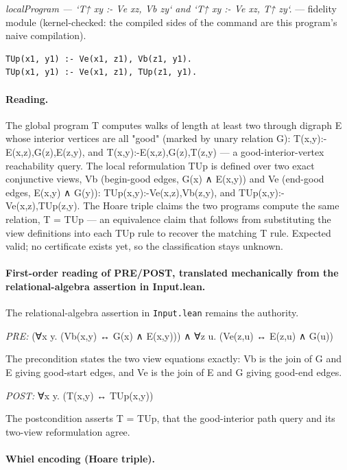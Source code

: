 \documentclass[10pt]{article}
\begin{document}
{\raggedright\textit{localProgram --- `T↑ xy :- Ve xz, Vb zy` and `T↑ xy :- Ve xz, T↑ zy`.} --- fidelity module (kernel-checked: the compiled sides of the command are this program's naive compilation).\par}

\begin{Verbatim}[fontsize=\scriptsize,breaklines=true,breakanywhere=true,frame=single,framesep=1.5mm]
TUp(x1, y1) :- Ve(x1, z1), Vb(z1, y1).
TUp(x1, y1) :- Ve(x1, z1), TUp(z1, y1).
\end{Verbatim}

\paragraph{Reading.} The global program T computes walks of length at least two through digraph E whose interior vertices are all "good" (marked by unary relation G): T(x,y):-E(x,z),G(z),E(z,y), and T(x,y):-E(x,z),G(z),T(z,y) --- a good-interior-vertex reachability query. The local reformulation TUp is defined over two exact conjunctive views, Vb (begin-good edges, G(x) ∧ E(x,y)) and Ve (end-good edges, E(x,y) ∧ G(y)): TUp(x,y):-Ve(x,z),Vb(z,y), and TUp(x,y):-Ve(x,z),TUp(z,y). The Hoare triple claims the two programs compute the same relation, T = TUp --- an equivalence claim that follows from substituting the view definitions into each TUp rule to recover the matching T rule. Expected valid; no certificate exists yet, so the classification stays unknown.

\paragraph{First-order reading of PRE/POST, translated mechanically from the relational-algebra assertion in Input.lean.} The relational-algebra assertion in \texttt{Input.lean} remains the authority.

\textit{PRE:} (∀x y. (Vb(x,y) ↔ G(x) ∧ E(x,y))) ∧ ∀z u. (Ve(z,u) ↔ E(z,u) ∧ G(u))\par The precondition states the two view equations exactly: Vb is the join of G and E giving good-start edges, and Ve is the join of E and G giving good-end edges.

\textit{POST:} ∀x y. (T(x,y) ↔ TUp(x,y))\par The postcondition asserts T = TUp, that the good-interior path query and its two-view reformulation agree.

\paragraph{Whiel encoding (Hoare triple).}
\end{document}
